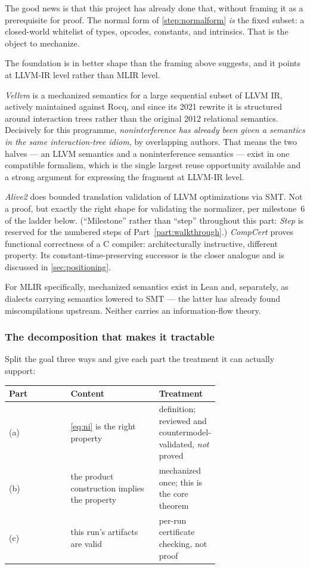 The good news is that this project has already done that, without framing it as a
prerequisite for proof. The normal form of \cref{step:normalform} \emph{is} the
fixed subset: a closed-world whitelist of types, opcodes, constants, and
intrinsics. That is the object to mechanize.

\begin{remark}
\label{rem:priorwork}
The foundation is in better shape than the framing above suggests, and it points
at LLVM-IR level rather than MLIR level.

\emph{Vellvm} is a mechanized semantics for a large sequential subset of LLVM IR,
actively maintained against Rocq, and since its 2021 rewrite it is structured
around interaction trees rather than the original 2012 relational semantics.
Decisively for this programme, \emph{noninterference has already been given a
semantics in the same interaction-tree idiom}, by overlapping authors. That means
the two halves --- an LLVM semantics and a noninterference semantics --- exist in
one compatible formalism, which is the single largest reuse opportunity
available and a strong argument for expressing the fragment at LLVM-IR level.

\emph{Alive2} does bounded translation validation of LLVM optimizations via SMT.
Not a proof, but exactly the right shape for validating the normalizer, per
milestone~6 of the ladder below. (``Milestone'' rather than ``step'' throughout
this part: \emph{Step} is reserved for the numbered steps of
Part~\ref{part:walkthrough}.)
\emph{CompCert} proves functional correctness of a C compiler: architecturally
instructive, different property. Its constant-time-preserving successor is the
closer analogue and is discussed in \cref{sec:positioning}.

For MLIR specifically, mechanized semantics exist in Lean and, separately, as
dialects carrying semantics lowered to SMT --- the latter has already found
miscompilations upstream. Neither carries an information-flow theory.
\end{remark}

\subsubsection*{The decomposition that makes it tractable}

Split the goal three ways and give each part the treatment it can actually
support:

\begin{center}
\begin{tabular}{@{}l p{0.42\linewidth} p{0.28\linewidth}@{}}
\toprule
Part & Content & Treatment \\
\midrule
(a) & \eqref{eq:ni} is the right property & definition; reviewed and
      countermodel-validated, \emph{not} proved \\[3pt]
(b) & the product construction implies the property & mechanized once; this is
      the core theorem \\[3pt]
(c) & this run's artifacts are valid & per-run certificate checking, not proof \\
\bottomrule
\end{tabular}
\end{center}

